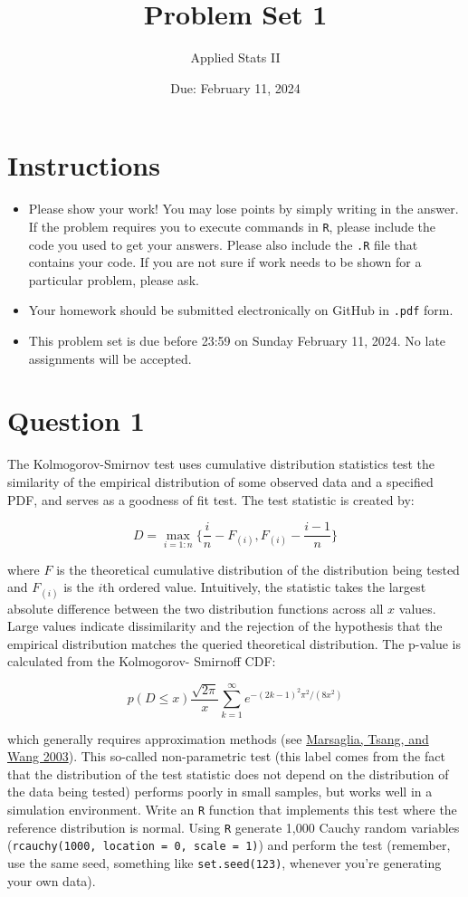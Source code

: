 \documentclass{article} %
\title{Problem Set 1}
\date{Due: February 11, 2024}
\author{Applied Stats II}
\begin{document}
	\maketitle
	\section*{Instructions}
	\begin{itemize}
	\item Please show your work! You may lose points by simply writing in the answer. If the problem requires you to execute commands in \texttt{R}, please include the code you used to get your answers. Please also include the \texttt{.R} file that contains your code. If you are not sure if work needs to be shown for a particular problem, please ask.
\item Your homework should be submitted electronically on GitHub in \texttt{.pdf} form.
\item This problem set is due before 23:59 on Sunday February 11, 2024. No late assignments will be accepted.
	\end{itemize}

	\vspace{.25cm}
\section*{Question 1} 
\vspace{.25cm}
\noindent The Kolmogorov-Smirnov test uses cumulative distribution statistics test the similarity of the empirical distribution of some observed data and a specified PDF, and serves as a goodness of fit test. The test statistic is created by:

$$D = \max_{i=1:n} \Big\{ \frac{i}{n}  - F_{(i)}, F_{(i)} - \frac{i-1}{n} \Big\}$$

\noindent where $F$ is the theoretical cumulative distribution of the distribution being tested and $F_{(i)}$ is the $i$th ordered value. Intuitively, the statistic takes the largest absolute difference between the two distribution functions across all $x$ values. Large values indicate dissimilarity and the rejection of the hypothesis that the empirical distribution matches the queried theoretical distribution. The p-value is calculated from the Kolmogorov-
Smirnoff CDF:

$$p(D \leq x) \frac{\sqrt {2\pi}}{x} \sum _{k=1}^{\infty }e^{-(2k-1)^{2}\pi ^{2}/(8x^{2})}$$


\noindent which generally requires approximation methods (see \href{https://core.ac.uk/download/pdf/25787785.pdf}{Marsaglia, Tsang, and Wang 2003}). This so-called non-parametric test (this label comes from the fact that the distribution of the test statistic does not depend on the distribution of the data being tested) performs poorly in small samples, but works well in a simulation environment. Write an \texttt{R} function that implements this test where the reference distribution is normal. Using \texttt{R} generate 1,000 Cauchy random variables (\texttt{rcauchy(1000, location = 0, scale = 1)}) and perform the test (remember, use the same seed, something like \texttt{set.seed(123)}, whenever you're generating your own data).\\
\end{document}

